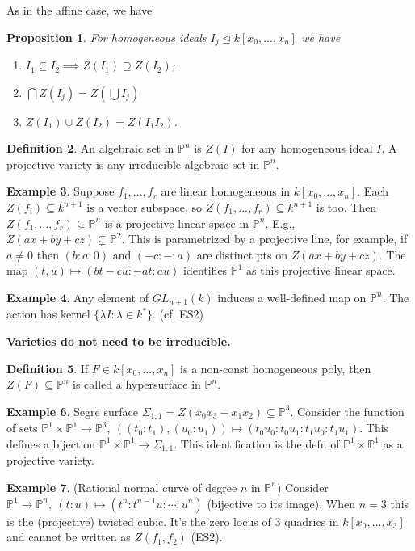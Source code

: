 \documentclass{article}
\theoremstyle{definition}
\newtheorem{defn}{Definition}[section]
\newtheorem{example}[defn]{Example}
\theoremstyle{remark}
\theoremstyle{plain}
\newtheorem{prop}[defn]{Proposition}
\newcommand{\PP}{\mathbb{P}}
\begin{document}
As in the affine case, we have
\begin{prop}
    For homogeneous ideals $I_j\trianglelefteq k[x_0,...,x_n]$ we have 
    \begin{enumerate}[1)]
        \item $I_1\subseteq I_2\implies Z(I_1)\supseteq Z(I_2)$;
        \item $\bigcap Z(I_j)=Z(\bigcup I_j)$
        \item $Z(I_1)\cup Z(I_2)=Z(I_1I_2)$.
    \end{enumerate}
\end{prop}
\begin{defn}
    An algebraic set in $\PP^n$ is $Z(I)$ for any homogeneous ideal $I$. A projective variety is any irreducible algebraic set in $\PP^n$.
\end{defn}
\begin{example}
    Suppose $f_1,...,f_r$ are linear homogeneous in $k[x_0,...,x_n]$. Each $Z(f_i)\subseteq k^{n+1}$ is a vector subspace, so $Z(f_1,...,f_r)\subseteq k^{n+1}$ is too. Then $Z(f_1,...,f_r)\subseteq\PP^n$ is a projective linear space in $\PP^n$. E.g., $Z(ax+by+cz)\subsetneq\PP^2$. This is parametrized by a projective line, for example, if $a\neq 0$ then $(b:a:0)$ and $(-c:-:a)$ are distinct pts on $Z(ax+by+cz)$.  The map $(t,u)\mapsto (bt-cu:-at:au)$ identifies $\PP^1$ as this projective linear space.
\end{example}
\begin{example}
    Any element of $GL_{n+1}(k)$ induces a well-defined map on $\PP^n$. The action has kernel $\{\lambda I:\lambda\in k^\ast\}$. (cf. ES2)
\end{example}

\textbf{Varieties do not need to be irreducible.}
\begin{defn}
    If $F\in k[x_0,...,x_n]$ is a non-const homogeneous poly, then $Z(F)\subseteq\PP^n$ is called a hypersurface in $\PP^n$.
\end{defn}
\begin{example}
    Segre surface $\Sigma_{1,1}=Z(x_0x_3-x_1x_2)\subseteq\PP^3$. Consider the function of sets
    $\PP^1\times\PP^1\to\PP^3,\ ((t_0:t_1),(u_0:u_1))\mapsto (t_0u_0:t_0u_1:t_1u_0:t_1u_1)$. This defines a bijection $\PP^1\times\PP^1\to\Sigma_{1,1}$. This identification is the defn of $\PP^1\times\PP^1$ as a projective variety.
\end{example}
\begin{example}
    (Rational normal curve of degree $n$ in $\PP^n$) Consider $\PP^1\to\PP^n,\ (t:u)\mapsto (t^n:t^{n-1}u:\cdots:u^n)$ (bijective to its image). When $n=3$ this is the (projective) twisted cubic. It's the zero locus of $3$ quadrics in $k[x_0,...,x_3]$ and cannot be written as $Z(f_1,f_2)$ (ES2).
\end{example}
\end{document}
